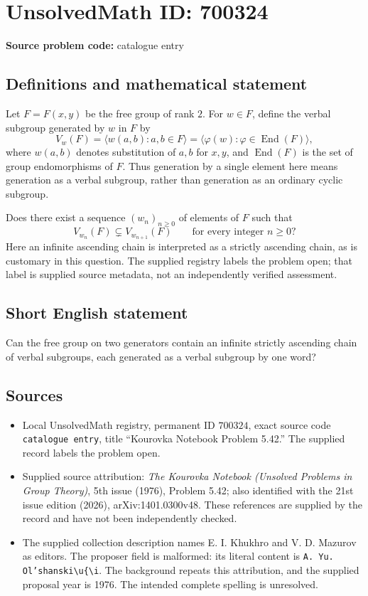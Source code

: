 \documentclass[11pt]{article}
\begin{document}
\section*{UnsolvedMath ID: 700324}
\textbf{Source problem code:} catalogue entry
\subsection{Definitions and mathematical statement}
Let \(F=F(x,y)\) be the free group of rank \(2\). For \(w\in F\), define the verbal subgroup generated by \(w\) in \(F\) by
\[
V_w(F)=\bigl\langle w(a,b):a,b\in F\bigr\rangle
       =\bigl\langle \varphi(w):\varphi\in\operatorname{End}(F)\bigr\rangle,
\]
where \(w(a,b)\) denotes substitution of \(a,b\) for \(x,y\), and \(\operatorname{End}(F)\) is the set of group endomorphisms of \(F\). Thus generation by a single element here means generation as a verbal subgroup, rather than generation as an ordinary cyclic subgroup.

Does there exist a sequence \((w_n)_{n\geq 0}\) of elements of \(F\) such that
\[
V_{w_n}(F)\subsetneq V_{w_{n+1}}(F)
\qquad\text{for every integer }n\geq 0?
\]
Here an infinite ascending chain is interpreted as a strictly ascending chain, as is customary in this question. The supplied registry labels the problem open; that label is supplied source metadata, not an independently verified assessment.
\subsection{Short English statement}
Can the free group on two generators contain an infinite strictly ascending chain of verbal subgroups, each generated as a verbal subgroup by one word?
\subsection{Sources}
\begin{itemize}
\item Local UnsolvedMath registry, permanent ID \(700324\), exact source code \texttt{catalogue entry}, title ``Kourovka Notebook Problem 5.42.'' The supplied record labels the problem open.
\item Supplied source attribution: \emph{The Kourovka Notebook (Unsolved Problems in Group Theory)}, 5th issue (1976), Problem 5.42; also identified with the 21st issue edition (2026), arXiv:1401.0300v48. These references are supplied by the record and have not been independently checked.
\item The supplied collection description names E. I. Khukhro and V. D. Mazurov as editors. The proposer field is malformed: its literal content is \texttt{A. Yu. Ol'shanski\textbackslash u\{\textbackslash i}. The background repeats this attribution, and the supplied proposal year is 1976. The intended complete spelling is unresolved.
\end{itemize}
\end{document}
